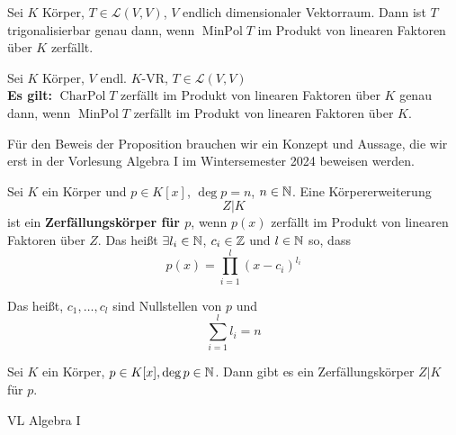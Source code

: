 \setcounter{subenvironmentnumber}{5}
\begin{subcorollary}
	Sei $ K $ Körper, $ T \in \mathcal{L} (V, V) $, $ V $ endlich dimensionaler Vektorraum.
	Dann ist $ T $ trigonalisierbar genau dann, wenn $ \operatorname{Min Pol} T $ im Produkt von linearen Faktoren über $ K $ zerfällt.
\end{subcorollary}

\begin{subproposition*}
	Sei $ K $ Körper, $ V $ endl. $ K $-VR, $ T \in \mathcal{L} (V, V) $\\
	\textbf{Es gilt:} $ \operatorname{Char Pol} T $ zerfällt im Produkt von linearen Faktoren über $ K $ genau dann, wenn $ \operatorname{Min Pol} T $ zerfällt im Produkt von linearen Faktoren über $ K $.
\end{subproposition*}

Für den Beweis der Proposition brauchen wir ein Konzept und Aussage, die wir erst in der Vorlesung Algebra I im Wintersemester 2024 beweisen werden.

\begin{subdefinition}
	Sei $ K $ ein Körper und $ p \in K[x] $, $ \deg p = n $, $ n \in \mathbb{N}  $.
	Eine Körpererweiterung
	\[
		Z | K
	\]
	ist ein \textbf{Zerfällungskörper für $ p $}, wenn $ p(x) $ zerfällt im Produkt von linearen Faktoren über $ Z $.
	Das heißt $ \exists l_i \in \mathbb{N}  $, $ c_i \in \mathbb{Z}  $ und $ l \in \mathbb{N}  $ so, dass
	\begin{equation}
		\label{eq:Faktorisierung}
		\tag{$ * $}
		p(x) = \prod_{i = 1}^{l} (x - c_i)^{l_i}  
	\end{equation}
	
	Das heißt, $ c_1, \dotsc, c_l $ sind Nullstellen von $ p $ und
	\[
		\sum_{i=1}^{l} l_i = n
	\]
\end{subdefinition}

\begin{subtheorem*}
	Sei $ K $ ein Körper, $ p \in K[x], \deg p \in \mathbb{N}  $.
	Dann gibt es ein Zerfällungskörper $ Z | K $ für $ p $.
	\begin{subproof*}
		VL Algebra I
	\end{subproof*}
\end{subtheorem*}

